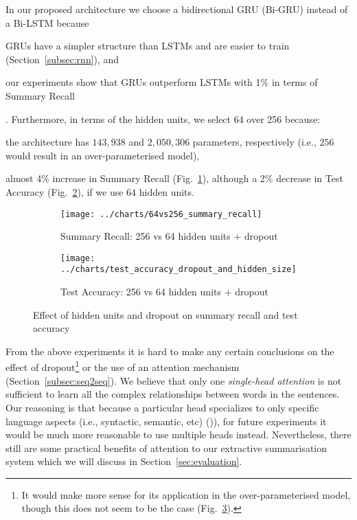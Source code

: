 In our proposed architecture we choose a bidirectional GRU (Bi-GRU) instead of a Bi-LSTM because
\begin{enumerate*}
    \item GRUs have a simpler structure than LSTMs and are easier to train (Section~\ref{subsec:rnn}), and
    \item our experiments show that GRUs outperform LSTMs with 1\% in terms of Summary Recall
\end{enumerate*}.
Furthermore, in terms of the hidden units, we select 64 over 256 because:
\begin{enumerate*}
    \item the architecture has $143,938$ and $2,050,306$ parameters, respectively (i.e., $256$ would result in an over-parameterised model),
    \item almost 4\% increase in Summary Recall (Fig.~\ref{fig:64vs256_summary_recall}),
    although a 2\% decrease in Test Accuracy (Fig.~\ref{fig:test_accuracy_dropout_and_hidden_size}), if we use $64$ hidden units.
\end{enumerate*}
\begin{figure}[ht]
    \begin{subfigure}{0.49\textwidth}
        \centering \texttt{[image: ../charts/64vs256\_summary\_recall]}
        \caption{Summary Recall: 256 vs 64 hidden units + dropout}
        \label{fig:64vs256_summary_recall}
    \end{subfigure}%
    \hfill
    \begin{subfigure}{0.49\textwidth}
        \centering
        \texttt{[image: ../charts/test\_accuracy\_dropout\_and\_hidden\_size]}
        \caption{Test Accuracy: 256 vs 64 hidden units + dropout}
        \label{fig:test_accuracy_dropout_and_hidden_size}
    \end{subfigure}
    \caption{Effect of hidden units and dropout on summary recall and test accuracy}
    \label{fig:dropout_and_hidden_size}
\end{figure}

From the above experiments it is hard to make any certain conclusions on the effect of dropout\footnote{
    It would make more sense for its application in the over-parameterised model, though this does not seem to be the case (Fig.~\ref{fig:dropout_and_hidden_size}).
} or the use of an attention mechanism (Section~\ref{subsec:seq2seq}).
We believe that only one \emph{single-head attention} is not sufficient to learn all the complex relationships between words in the sentences.
Our reasoning is that because a particular head specializes to only specific language aspects (i.e., syntactic, semantic, etc) (\cite{clark-etal-2019-bert})),
for future experiments it would be much more reasonable to use multiple heads instead.
Nevertheless, there still are some practical benefits of attention to our extractive summarisation system which we will discuss in Section~\ref{sec:evaluation}.